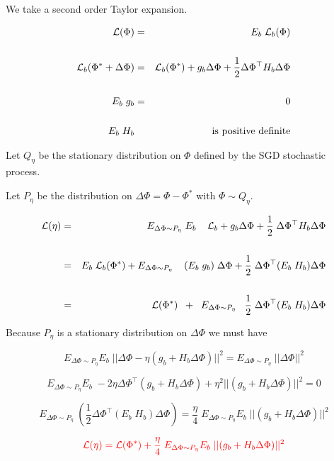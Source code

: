 {\vfill
We take a second order Taylor expansion.

\begin{eqnarray*}
{\cal L}(\Phi) & = & E_b\;{\cal L}_b(\Phi) \\
\\
{\cal L}_b(\Phi^* + \Delta \Phi) & = & {\cal L}_b(\Phi^*) + g_b \Delta \Phi + \frac{1}{2} \Delta\Phi^\top H_b \Delta\Phi \\
\\
E_b\; g_b & = & 0\\
\\
E_b\; H_b & & \mbox{is positive definite}
\end{eqnarray*}


Let $Q_\eta$ be the stationary distribution on $\Phi$ defined by the SGD stochastic process.

\vfill
Let $P_\eta$ be the distribution on $\Delta\Phi = \Phi - \Phi^*$ with $\Phi \sim Q_\eta$.

\begin{eqnarray*}
{\cal L}(\eta) & = & \;\;\; E_{\Delta \Phi \sim P_\eta}\;E_b \;\;\;\; {\cal L}_b + g_b\Delta \Phi + \frac{1}{2}\;\Delta \Phi^\top H_b \Delta \Phi \\
\\
& = & E_b\; {\cal L}_b(\Phi^*) + E_{\Delta \Phi \sim P_\eta} \;\;\;\;(E_b\;g_b) \;\Delta \Phi + \frac{1}{2}\;\Delta \Phi^\top (E_b\; H_b) \Delta \Phi \\
\\
& = & {\cal L}(\Phi^*)\;\; + \;\; E_{\Delta \Phi \sim P_\eta}\;\;\;\frac{1}{2}\;\Delta \Phi^\top (E_b\;H_b) \Delta \Phi
\end{eqnarray*}

Because $P_\eta$ is a stationary distribution on $\Delta \Phi$ we must have

$$E_{\Delta \Phi \sim P_\eta}E_b\; ||\Delta \Phi - \eta (g_b + H_b\Delta \Phi)||^2 = E_{\Delta \Phi \sim P_\eta}\; ||\Delta \Phi||^2$$

\vfill
$$E_{\Delta \Phi \sim P_\eta}E_b\;-2\eta \Delta \Phi^\top (g_b + H_b\Delta \Phi) +\eta^2||(g_b + H_b\Delta \Phi)||^2 = 0$$

\vfill
$$E_{\Delta \Phi \sim P_\eta}\;\left(\frac{1}{2}\Delta \Phi^\top (E_b \;H_b)\Delta \Phi\right) = \frac{\eta}{4}\;E_{\Delta \Phi \sim P_\eta}E_b \;||(g_b + H_b\Delta \Phi)||^2$$

\vfill
$${\color{red} {\cal L}(\eta)  = {\cal L}(\Phi^*) + \frac{\eta}{4}\;E_{\Delta \Phi \sim P_\eta}E_b \;||(g_b + H_b\Delta \Phi)||^2}$$

}
